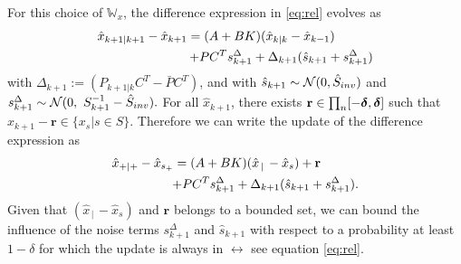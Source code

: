 \documentclass{ifacconf}
\begin{document}
For this choice of  	$\mathbb W_x$, the difference expression in \eqref{eq:rel} evolves   as 
\begin{align}
 \hat x_{k+1|k+1}-	\hat x_{k+1}=(A+BK)(\hat x_{k|k}-\hat x_{k-1})\qquad \quad\notag\\+  \bar P   C^T s^\Delta_{k+1} +\Delta_{k+1}( \hat{s}_{k+1}+ s^\Delta_{k+1})\label{eq:beliefx2}
\end{align}
 with $\Delta_{k+1}:=(P_{k+1|k}C^T-  \bar P   C^T)$, and with $ \hat{s}_{k+1}\sim \CA N (0,\hat{S}_{inv})$ and $ s^\Delta_{k+1}\sim  \CA N (0,\  S_{k+1}^{-1}-\hat{S}_{inv}). $
For all $ \hat x_{k+1}$, there exists $\mathbf  r \in \prod_n[-\grid ,\grid]$ such that   $\hat x_{k+1}-\mathbf r \in \{x_s| s \in S\}$. Therefore we can write the update of the difference expression as  \begin{align}
 \hat x_{+|+}-	\hat x_{s_+}=(A+BK)(\hat x_{\,|\,}-\hat x_s)+\mathbf r\qquad \quad\notag\\+  \bar P   C^T s^\Delta_{k+1} +\Delta_{k+1}( \hat{s}_{k+1}+ s^\Delta_{k+1})\label{eq:beliefx2}.
\end{align}
Given that $(\hat x_{\,|\,}-\hat x_s)$ and  $\mathbf r$ belongs to a bounded set, we can bound the influence of the noise terms $s^\Delta_{k+1}$ and $ \hat{s}_{k+1}$ with respect to a probability at least $1-\delta$ for which the update is always in $\rel$ see equation \eqref{eq:rel}.
\end{document}
